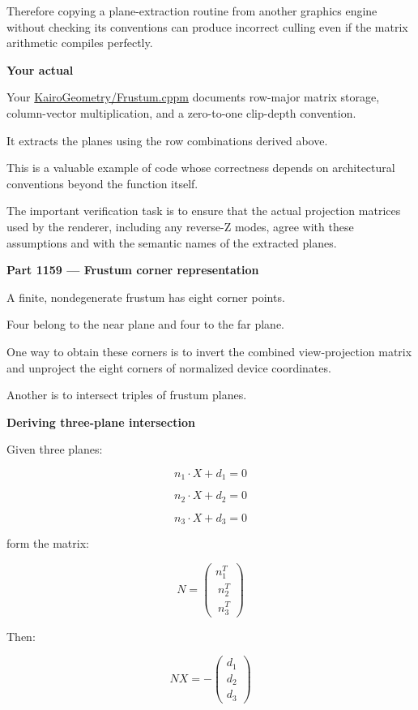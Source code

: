Therefore copying a plane-extraction routine from another graphics engine without checking its conventions can produce incorrect culling even if the matrix arithmetic compiles perfectly.

\textbf{Your actual }

Your \href{https://github.com/swayam8624/KairoGeometry/blob/master/Frustum.cppm?utm_source=chatgpt.com}{KairoGeometry/Frustum.cppm} documents row-major matrix storage, column-vector multiplication, and a zero-to-one clip-depth convention.

It extracts the planes using the row combinations derived above.

This is a valuable example of code whose correctness depends on architectural conventions beyond the function itself.

The important verification task is to ensure that the actual projection matrices used by the renderer, including any reverse-Z modes, agree with these assumptions and with the semantic names of the extracted planes.

\textbf{Part 1159 --- Frustum corner representation}

A finite, nondegenerate frustum has eight corner points.

Four belong to the near plane and four to the far plane.

One way to obtain these corners is to invert the combined view-projection matrix and unproject the eight corners of normalized device coordinates.

Another is to intersect triples of frustum planes.

\textbf{Deriving three-plane intersection}

Given three planes:

\[
n_1\cdot X+d_1=0
\]

\[
n_2\cdot X+d_2=0
\]

\[
n_3\cdot X+d_3=0
\]

form the matrix:

\[
N= \begin{pmatrix} n_1^T\\\ n_2^T\\\ n_3^T \end{pmatrix}
\]

Then:

\[
NX= -\begin{pmatrix} d_1\\ d_2\\ d_3 \end{pmatrix}
\]

